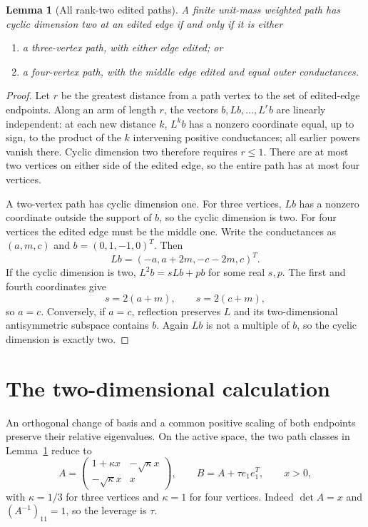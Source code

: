 \documentclass[11pt]{article}
\newtheorem{lemma}[theorem]{Lemma}
\begin{document}
\begin{lemma}[All rank-two edited paths]\label{lem:paths}
A finite unit-mass weighted path has cyclic dimension two at an
edited edge if and only if it is either
\begin{enumerate}
 \item a three-vertex path, with either edge edited; or
 \item a four-vertex path, with the middle edge edited and equal
       outer conductances.
\end{enumerate}
\end{lemma}
\begin{proof}
Let $r$ be the greatest distance from a path vertex to the set of
edited-edge endpoints. Along an arm of length $r$, the vectors
$b,Lb,\ldots,L^rb$ are linearly independent: at each new distance
$k$, $L^kb$ has a nonzero coordinate equal, up to sign, to the product
of the $k$ intervening positive conductances; all earlier powers
vanish there. Cyclic dimension two therefore requires $r\le1$.
There are at most two vertices on either side of the edited edge,
so the entire path has at most four vertices.

A two-vertex path has cyclic dimension one. For three vertices,
$Lb$ has a nonzero coordinate outside the support of $b$, so the
cyclic dimension is two. For four vertices the edited edge must be
the middle one. Write the conductances as $(a,m,c)$ and
$b=(0,1,-1,0)^T$. Then
\[
 Lb=(-a,a+2m,-c-2m,c)^T.
\]
If the cyclic dimension is two, $L^2b=sLb+pb$ for some real $s,p$.
The first and fourth coordinates give
\[
 s=2(a+m),\qquad s=2(c+m),
\]
so $a=c$. Conversely, if $a=c$, reflection preserves $L$ and its
two-dimensional antisymmetric subspace contains $b$. Again $Lb$ is
not a multiple of $b$, so the cyclic dimension is exactly two.
\end{proof}

\section{The two-dimensional calculation}

An orthogonal change of basis and a common positive scaling of both
endpoints preserve their relative eigenvalues. On the active space,
the two path classes in Lemma~\ref{lem:paths} reduce to
\begin{equation}\label{eq:canonical}
 A=\begin{pmatrix}
       1+\kappa x&-\sqrt\kappa x\\
       -\sqrt\kappa x&x
    \end{pmatrix},\qquad
 B=A+\tau e_1e_1^T,\qquad x>0,
\end{equation}
with $\kappa=1/3$ for three vertices and $\kappa=1$ for four vertices.
Indeed $\det A=x$ and $(A^{-1})_{11}=1$, so the leverage is $\tau$.
\end{document}
